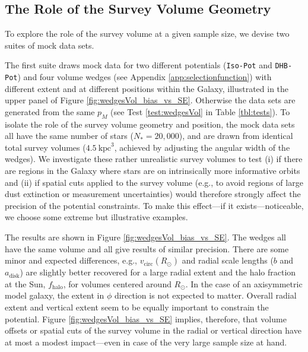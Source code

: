 \documentclass[iop,revtex4,numberedappendix,appendixfloats]{emulateapj}
\newcommand{\pmodel}{\ensuremath{p_M}}
\begin{document}

\subsection{The Role of the Survey Volume Geometry} \label{sec:results_obsvolume}

To explore the role of the survey volume at a given sample size, we devise two suites of mock data sets.

The first suite draws mock data for two different potentials (\texttt{Iso-Pot} and \texttt{DHB-Pot}) and four volume wedges (see Appendix \ref{app:selectionfunction}) with different extent and at different positions within the Galaxy, illustrated in the upper panel of Figure \ref{fig:wedgesVol_bias_vs_SE}. Otherwise the data sets are generated from the same \pmodel{} (see Test \ref{test:wedgesVol} in Table \ref{tbl:tests}). To isolate the role of the survey volume geometry and position, the mock data sets all have the same number of stars ($N_{*} = 20,000$), and are drawn from identical total survey volumes ($4.5~\text{kpc}^3$, achieved by adjusting the angular width of the wedges).
We investigate these rather unrealistic survey volumes to test (i) if there are regions in the Galaxy where stars are on intrinsically more informative orbits and (ii) if spatial cuts applied to the survey volume (e.g., to avoid regions of large dust extinction or measurement uncertainties) would therefore strongly affect the precision of the potential constraints. To make this effect---if it exists---noticeable, we choose some extreme but illustrative examples.

The results are shown in Figure \ref{fig:wedgesVol_bias_vs_SE}. The wedges all have the same volume and all give results of similar precision. There are some minor and expected differences, e.g., $v_\text{circ}(R_\odot)$ and radial scale lengths ($b$ and $a_\text{disk}$) are slightly better recovered for a large radial extent and the halo fraction at the Sun, $f_\text{halo}$, for volumes centered around $R_\odot$. In the case of an axisymmetric model galaxy, the extent in $\phi$ direction is not expected to matter. Overall radial extent and vertical extent seem to be equally important to constrain the potential. Figure \ref{fig:wedgesVol_bias_vs_SE} implies, therefore, that volume offsets or spatial cuts of the survey volume in the radial or vertical direction have at most a modest impact---even in case of the very large sample size at hand.
\end{document}
